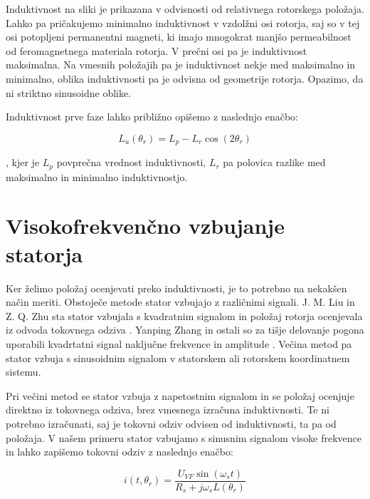 \documentclass[a4paper,twoside,openright,12pt,slovene]{book}
\begin{document}
Induktivnost na sliki je prikazana v odvisnosti od relativnega rotorskega položaja. Lahko pa pričakujemo minimalno induktivnost v vzdolžni osi rotorja, saj so v tej osi potopljeni permanentni magneti,
ki imajo mnogokrat manjšo permeabilnost od feromagnetnega materiala rotorja. V prečni osi pa je induktivnost maksimalna. Na vmesnih položajih pa je induktivnost nekje med maksimalno in minimalno,
oblika induktivnosti pa je odvisna od geometrije rotorja. Opazimo, da ni striktno sinusoidne oblike.

Induktivnost prve faze lahko približno opišemo z naslednjo enačbo:

\begin{equation}
    L_u(\theta_r) = L_p - L_r \cos(2\theta_r)
\end{equation}

, kjer je $L_p$ povprečna vrednost induktivnosti, $L_r$ pa polovica razlike med maksimalno in minimalno induktivnostjo. 

\section{Visokofrekvenčno vzbujanje statorja}

Ker želimo položaj ocenjevati preko induktivnosti, je to potrebno na nekakšen način meriti. Obstoječe metode stator vzbujajo z različnimi signali. J. M. Liu in Z. Q. Zhu sta stator vzbujala s
kvadratnim signalom in položaj rotorja ocenjevala iz odvoda tokovnega odziva \cite{6689315}. Yanping Zhang in ostali so za tišje delovanje pogona uporabili kvadrtatni signal naključne frekvence in
amplitude \cite{8818673}. Večina metod pa stator vzbuja s sinusoidnim signalom v statorskem \cite{6676793} ali rotorskem \cite{ThreeYearsOfExperience} \cite{8746146} koordinatnem sistemu. 

Pri večini metod se stator vzbuja z napetostnim signalom in se položaj ocenjuje direktno iz tokovnega odziva, brez vmesnega izračuna induktivnosti. Te ni potrebno izračunati, saj je tokovni odziv
odvisen od induktivnosti, ta pa od položaja. V našem primeru stator vzbujamo s sinusnim signalom visoke frekvence in lahko zapišemo tokovni odziv z naslednjo enačbo:

\begin{equation}
    i(t,\theta_r) = \frac{U_{VF}\sin(\omega_st)}{R_s + j\omega_sL(\theta_r)}
\end{equation}
\end{document}
